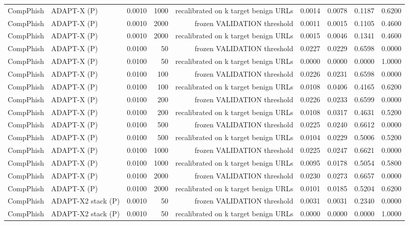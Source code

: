 \begin{table}[t]
\begin{tabular}{llrrrrrrr}
CompPhish & ADAPT-X (P) & 0.0010 & 1000 & recalibrated on k target benign URLs & 0.0014 & 0.0078 & 0.1187 & 0.6200 \\
CompPhish & ADAPT-X (P) & 0.0010 & 2000 & frozen VALIDATION threshold & 0.0011 & 0.0015 & 0.1105 & 0.4600 \\
CompPhish & ADAPT-X (P) & 0.0010 & 2000 & recalibrated on k target benign URLs & 0.0015 & 0.0046 & 0.1341 & 0.4600 \\
CompPhish & ADAPT-X (P) & 0.0100 & 50 & frozen VALIDATION threshold & 0.0227 & 0.0229 & 0.6598 & 0.0000 \\
CompPhish & ADAPT-X (P) & 0.0100 & 50 & recalibrated on k target benign URLs & 0.0000 & 0.0000 & 0.0000 & 1.0000 \\
CompPhish & ADAPT-X (P) & 0.0100 & 100 & frozen VALIDATION threshold & 0.0226 & 0.0231 & 0.6598 & 0.0000 \\
CompPhish & ADAPT-X (P) & 0.0100 & 100 & recalibrated on k target benign URLs & 0.0108 & 0.0406 & 0.4165 & 0.6200 \\
CompPhish & ADAPT-X (P) & 0.0100 & 200 & frozen VALIDATION threshold & 0.0226 & 0.0233 & 0.6599 & 0.0000 \\
CompPhish & ADAPT-X (P) & 0.0100 & 200 & recalibrated on k target benign URLs & 0.0108 & 0.0317 & 0.4631 & 0.5200 \\
CompPhish & ADAPT-X (P) & 0.0100 & 500 & frozen VALIDATION threshold & 0.0225 & 0.0240 & 0.6612 & 0.0000 \\
CompPhish & ADAPT-X (P) & 0.0100 & 500 & recalibrated on k target benign URLs & 0.0104 & 0.0229 & 0.5006 & 0.5200 \\
CompPhish & ADAPT-X (P) & 0.0100 & 1000 & frozen VALIDATION threshold & 0.0225 & 0.0247 & 0.6621 & 0.0000 \\
CompPhish & ADAPT-X (P) & 0.0100 & 1000 & recalibrated on k target benign URLs & 0.0095 & 0.0178 & 0.5054 & 0.5800 \\
CompPhish & ADAPT-X (P) & 0.0100 & 2000 & frozen VALIDATION threshold & 0.0230 & 0.0273 & 0.6657 & 0.0000 \\
CompPhish & ADAPT-X (P) & 0.0100 & 2000 & recalibrated on k target benign URLs & 0.0101 & 0.0185 & 0.5204 & 0.6200 \\
CompPhish & ADAPT-X2 stack (P) & 0.0010 & 50 & frozen VALIDATION threshold & 0.0031 & 0.0031 & 0.2340 & 0.0000 \\
CompPhish & ADAPT-X2 stack (P) & 0.0010 & 50 & recalibrated on k target benign URLs & 0.0000 & 0.0000 & 0.0000 & 1.0000 \\

\end{tabular}
\end{table}

